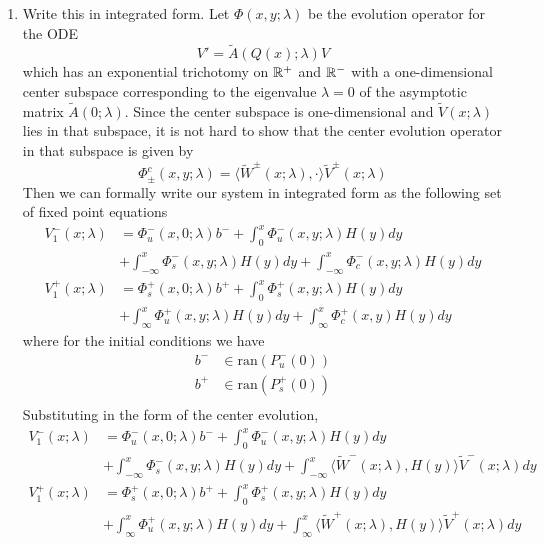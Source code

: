 \documentclass[thesis.tex]{subfiles}
\begin{document}
\begin{enumerate}
\item Write this in integrated form. Let $\Phi(x,y; \lambda)$ be the evolution operator for the ODE
\[
V' = \tilde{A}(Q(x); \lambda)V
\]
which has an exponential trichotomy on $\mathbb{R}^+$ and $\mathbb{R}^-$ with a one-dimensional center subspace corresponding to the eigenvalue $\lambda = 0$ of the asymptotic matrix $\tilde{A}(0; \lambda)$. Since the center subspace is one-dimensional and $\tilde{V}(x; \lambda)$ lies in that subspace, it is not hard to show that the center evolution operator in that subspace is given by
\[
\Phi^c_\pm(x,y; \lambda) = \langle \tilde{W}^\pm(x; \lambda), \cdot \rangle \tilde{V}^\pm(x; \lambda)
\]
Then we can formally write our system in integrated form as the following set of fixed point equations
\begin{equation*}
\begin{aligned}
V_1^-(x; \lambda) &= \Phi_u^-(x, 0; \lambda) b^-
+ \int_0^x \Phi_u^-(x, y; \lambda) H(y) dy \\
&+ \int_{-\infty}^x \Phi_s^-(x, y; \lambda) H(y) dy + \int_{-\infty}^x \Phi_c^-(x, y; \lambda) H(y) dy \\ 
V_1^+(x; \lambda) &= \Phi_s^+(x, 0; \lambda) b^+ 
+ \int_0^x \Phi_s^+(x, y; \lambda)H(y) dy \\
&+ \int_{\infty}^x \Phi_u^+(x, y; \lambda)H(y) dy + \int_{\infty}^x \Phi_c^+(x, y) H(y) dy
\end{aligned}
\end{equation*}
where for the initial conditions we have
\begin{align*}
b^- &\in \text{ran}(P_u^-(0)) \\
b^+ &\in \text{ran}(P_s^+(0)) \\
\end{align*}
Substituting in the form of the center evolution,
\begin{equation*}
\begin{aligned}
V_1^-(x; \lambda) &= \Phi_u^-(x, 0; \lambda) b^- 
+ \int_0^x \Phi_u^-(x, y; \lambda) H(y) dy \\
&+ \int_{-\infty}^x \Phi_s^-(x, y; \lambda) H(y) dy + \int_{-\infty}^x \langle \tilde{W}^-(x; \lambda), H(y) \rangle \tilde{V}^-(x; \lambda) dy \\ 
V_1^+(x; \lambda) &= \Phi_s^+(x, 0; \lambda) b^+ 
+ \int_0^x \Phi_s^+(x, y; \lambda)H(y) dy \\
&+ \int_{\infty}^x \Phi_u^+(x, y; \lambda)H(y) dy + \int_{\infty}^x \langle \tilde{W}^+(x; \lambda), H(y) \rangle \tilde{V}^+(x; \lambda) dy
\end{aligned}
\end{equation*}


\end{enumerate}
\end{document}
